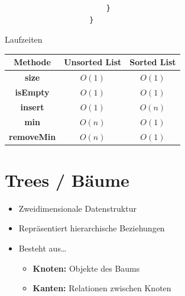 \documentclass[a4paper, landscape, 8pt]{scrartcl}
\begin{document}
\begin{multicols*}{4}
\begin{lstlisting}
                        }
                    }
                \end{lstlisting}
                \textcolor{subsectioncolor}{Laufzeiten}
                \begin{tabular}{c|c|c}
                    {\bfseries Methode} & {\bfseries Unsorted List} & {\bfseries Sorted List} \\
                    \hline
                    {\bfseries size} & $O(1)$ & $O(1)$ \\
                    {\bfseries isEmpty} & $O(1)$ & $O(1)$ \\
                    {\bfseries insert} & $O(1)$ & $O(n)$ \\
                    {\bfseries min} & $O(n)$ & $O(1)$ \\
                    {\bfseries removeMin} & $O(n)$ & $O(1)$ \\
                \end{tabular}

        \section{Trees / Bäume}
            \begin{itemize}
                \item Zweidimensionale Datenstruktur
                \item Repräsentiert hierarchische Beziehungen
                \item Besteht aus\ldots
                \begin{itemize}
                    \item {\bfseries Knoten:} Objekte des Baums
                    \item {\bfseries Kanten:} Relationen zwischen Knoten
                \end{itemize}
            \end{itemize}

\end{multicols*}
\end{document}
